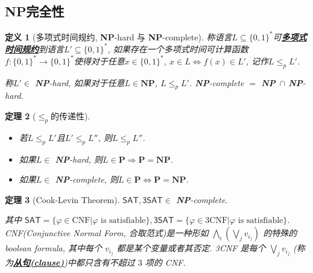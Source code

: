 \documentclass[8pt]{article}
\theoremstyle{compact}
\newtheorem{theorem}{定理}[section]
\newtheorem{definition}[theorem]{定义}
\def\obj#1{\textbf{\uline{#1}}}
\def\le{\leqslant}
\def\P{\textbf{P}}
\def\NP{\textbf{NP}}
\begin{document}
\subsection{\NP 完全性}
\begin{definition}[多项式时间规约, \NP-hard 与 \NP-complete]
	称语言$L \subseteq \{0, 1\}^*$可\obj{多项式时间规约}到语言$L' \subseteq \{0, 1\}^*$, 如果存在一个多项式时间可计算函数$f: \{0, 1\}^* \to \{0, 1\}^*$使得对于任意$x \in \{0, 1\}^*$, $x \in L \Leftrightarrow f(x) \in L'$, 记作$L \le_p L'$. 

	称$L' \in $ \NP-hard, 如果对于任意$L \in \NP$, $L \le_p L'$. \NP-complete $=$ \NP\ $\cap$ \NP-hard.  
\end{definition}
\begin{theorem}[$\le_p$的传递性]
	\begin{itemize}
		\item 若$L \le_p L'$且$L' \le_p L''$, 则$L \le_p L''$. 
		\item 如果$L \in $ \NP-hard, 则$L \in \P \Rightarrow \P = \NP$. 
		\item 如果$L \in $ \NP-complete, 则$L \in \P \Leftrightarrow \P = \NP$. 
	\end{itemize}
\end{theorem}
\begin{theorem}[Cook-Levin Theorem]
	$\textsf{SAT}, \textsf{3SAT} \in $ \NP-complete. 

	其中 $\textsf{SAT} = \{\varphi \in \text{CNF} | \varphi \text{ is satisfiable}\}, \textsf{3SAT} = \{\varphi \in 3\text{CNF} | \varphi \text{ is satisfiable}\}$. CNF(Conjunctive Normal Form, 合取范式)是一种形如 $\bigwedge_i\left(\bigvee_j v_{i_j}\right)$ 的特殊的 boolean formula, 其中每个 $v_{i_j}$ 都是某个变量或者其否定. 3CNF 是每个 $\bigvee_j v_{i_j}$ (称为\obj{从句(clause)})中都只含有不超过 $3$ 项的 CNF.
\end{theorem}
\end{document}

